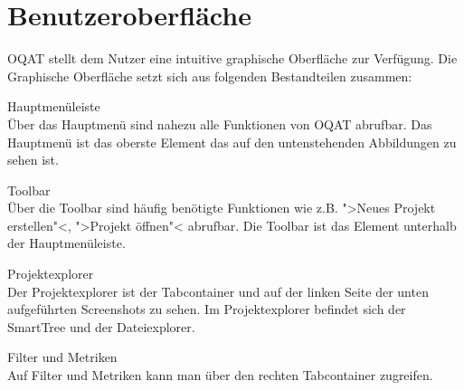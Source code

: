 \chapter{Benutzeroberfläche}
\setcounter{counterKriterien}{0}


\gls{OQAT} stellt dem Nutzer eine intuitive graphische Oberfläche zur Verfügung.
Die Graphische Oberfläche setzt sich aus folgenden Bestandteilen zusammen:

 Hauptmenüleiste\\
Über das Hauptmenü sind nahezu alle Funktionen von \gls{OQAT} abrufbar. Das Hauptmenü ist das oberste
Element das auf den untenstehenden Abbildungen zu sehen ist.

 Toolbar\\
Über die Toolbar sind häufig benötigte Funktionen wie z.B. ">Neues Projekt erstellen"<, ">Projekt öffnen"< abrufbar. Die Toolbar ist das Element unterhalb der Hauptmenüleiste.

 Projektexplorer\\
Der Projektexplorer ist der Tabcontainer und auf der linken Seite der unten aufgeführten Screenshots zu sehen. Im Projektexplorer befindet sich der SmartTree und der Dateiexplorer.

 Filter und Metriken\\
Auf Filter und Metriken kann man über den rechten Tabcontainer zugreifen.

